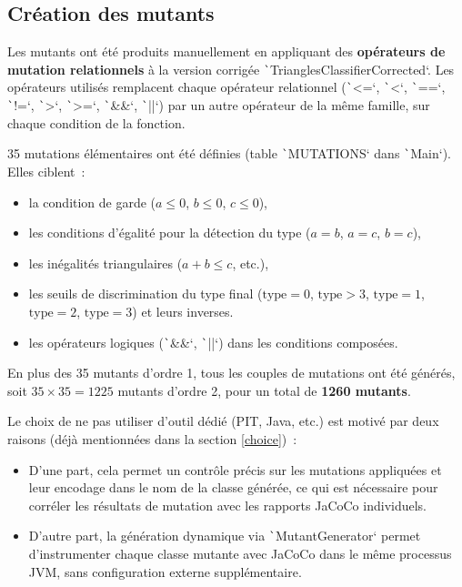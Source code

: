 \documentclass[a4paper,11pt]{article}
\begin{document}
\label{mutants}

\subsection{Création des mutants}

Les mutants ont été produits manuellement en appliquant des \textbf{opérateurs de mutation relation\-nels} à la version corrigée \texttt`TrianglesClassifierCorrected`. Les opérateurs utilisés remplacent chaque opérateur relationnel (\texttt`<=`, \texttt`<`, \texttt`==`, \texttt`!=`, \texttt`>`, \texttt`>=`, \texttt`&&`, \texttt`||`) par un autre opérateur de la même famille, sur chaque condition de la fonction.

35 mutations élémentaires ont été définies (table \texttt`MUTATIONS` dans \texttt`Main`). Elles ciblent~:

\begin{itemize}[label=$\bullet$]
    \item la condition de garde ($a \le 0$, $b \le 0$, $c \le 0$),
    \item les conditions d'égalité pour la détection du type ($a = b$, $a = c$, $b = c$),
    \item les inégalités triangulaires ($a + b \le c$, etc.),
    \item les seuils de discrimination du type final ($\text{type} = 0$, $\text{type} > 3$, $\text{type} = 1$, $\text{type} = 2$, $\text{type} = 3$) et leurs inverses.
    \item les opérateurs logiques (\texttt`&&`, \texttt`||`) dans les conditions composées.
\end{itemize}

En plus des 35 mutants d'ordre 1, tous les couples de mutations ont été générés, soit $35 \times 35 = 1225$ mutants d'ordre 2, pour un total de \textbf{1260 mutants}.

Le choix de ne pas utiliser d'outil dédié (PIT, \textmu Java, etc.) est motivé par deux raisons (déjà mentionnées dans la section \ref{choice})~:

\begin{itemize}[label=$\bullet$]
    \item D'une part, cela permet un contrôle précis sur les mutations appliquées et leur encodage dans le nom de la classe générée, ce qui est nécessaire pour corréler les résultats de mutation avec les rapports JaCoCo individuels.
    \item D'autre part, la génération dynamique via \texttt`MutantGenerator` permet d'instrumenter chaque classe mutante avec JaCoCo dans le même processus JVM, sans configuration externe supplémen\-taire.
\end{itemize}
\end{document}

